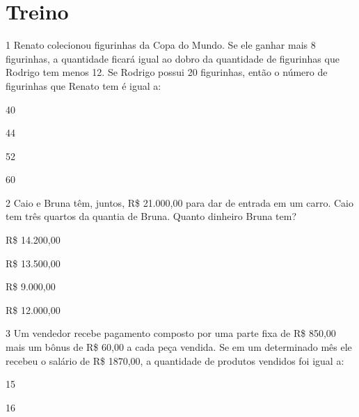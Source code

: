 \begin{escolha}
\begin{escolha}
\begin{boxpeq}
\end{boxpeq}

\section{Treino}

\num{1} Renato colecionou figurinhas da Copa do Mundo. Se ele ganhar mais 8
figurinhas, a quantidade ficará igual ao dobro da quantidade de figurinhas 
que Rodrigo tem menos 12. Se Rodrigo possui 20 figurinhas, então o número de
figurinhas que Renato tem é igual a:

\begin{escolha}

  \item 40

  \item 44

  \item 52

  \item 60

\end{escolha}


\num{2} Caio e Bruna têm, juntos, R\$ 21.000,00 para dar de entrada em um
carro. Caio tem três quartos da quantia de Bruna. Quanto dinheiro Bruna tem?

\begin{escolha}
  \item R\$ 14.200,00

  \item R\$ 13.500,00

  \item R\$ 9.000,00

  \item R\$ 12.000,00
\end{escolha}

\num{3} Um vendedor recebe pagamento composto por uma parte fixa de R\$
850,00 mais um bônus de R\$ 60,00 a cada peça vendida. Se em um
determinado mês ele recebeu o salário de R\$ 1870,00, a
quantidade de produtos vendidos foi igual a:

\begin{escolha}
  \item 15

  \item 16


\end{escolha}
\end{escolha}
\end{escolha}
